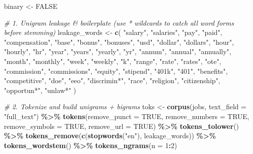\documentclass[
]{article}
\newenvironment{Shaded}{\begin{snugshade}}{\end{snugshade}}
\newcommand{\AttributeTok}[1]{\textcolor[rgb]{0.13,0.29,0.53}{#1}}
\newcommand{\CommentTok}[1]{\textcolor[rgb]{0.56,0.35,0.01}{\textit{#1}}}
\newcommand{\ConstantTok}[1]{\textcolor[rgb]{0.56,0.35,0.01}{#1}}
\newcommand{\DecValTok}[1]{\textcolor[rgb]{0.00,0.00,0.81}{#1}}
\newcommand{\FunctionTok}[1]{\textcolor[rgb]{0.13,0.29,0.53}{\textbf{#1}}}
\newcommand{\NormalTok}[1]{#1}
\newcommand{\OtherTok}[1]{\textcolor[rgb]{0.56,0.35,0.01}{#1}}
\newcommand{\SpecialCharTok}[1]{\textcolor[rgb]{0.81,0.36,0.00}{\textbf{#1}}}
\newcommand{\StringTok}[1]{\textcolor[rgb]{0.31,0.60,0.02}{#1}}
\begin{document}
\begin{Shaded}
\begin{Highlighting}[]
\NormalTok{binary }\OtherTok{\textless{}{-}} \ConstantTok{FALSE}

\CommentTok{\# 1. Unigram leakage \& boilerplate (use * wildcards to catch all word forms before stemming)}
\NormalTok{leakage\_words }\OtherTok{\textless{}{-}} \FunctionTok{c}\NormalTok{(}
  \StringTok{"salary"}\NormalTok{, }\StringTok{"salaries"}\NormalTok{, }\StringTok{"pay"}\NormalTok{, }\StringTok{"paid"}\NormalTok{, }\StringTok{"compensation"}\NormalTok{, }\StringTok{"base"}\NormalTok{, }\StringTok{"bonus"}\NormalTok{, }\StringTok{"bonuses"}\NormalTok{,}
  \StringTok{"usd"}\NormalTok{, }\StringTok{"dollar"}\NormalTok{, }\StringTok{"dollars"}\NormalTok{, }\StringTok{"hour"}\NormalTok{, }\StringTok{"hourly"}\NormalTok{, }\StringTok{"hr"}\NormalTok{, }\StringTok{"year"}\NormalTok{, }\StringTok{"years"}\NormalTok{, }\StringTok{"yearly"}\NormalTok{, }\StringTok{"yr"}\NormalTok{,}
  \StringTok{"annum"}\NormalTok{, }\StringTok{"annual"}\NormalTok{, }\StringTok{"annually"}\NormalTok{, }\StringTok{"month"}\NormalTok{, }\StringTok{"monthly"}\NormalTok{, }\StringTok{"week"}\NormalTok{, }\StringTok{"weekly"}\NormalTok{, }\StringTok{"k"}\NormalTok{,}
  \StringTok{"range"}\NormalTok{, }\StringTok{"rate"}\NormalTok{, }\StringTok{"rates"}\NormalTok{, }\StringTok{"ote"}\NormalTok{, }\StringTok{"commission"}\NormalTok{, }\StringTok{"commissions"}\NormalTok{, }\StringTok{"equity"}\NormalTok{,}
  \StringTok{"stipend"}\NormalTok{, }\StringTok{"401k"}\NormalTok{, }\StringTok{"401"}\NormalTok{, }\StringTok{"benefits"}\NormalTok{, }\StringTok{"competitive"}\NormalTok{, }\StringTok{"doe"}\NormalTok{,}
  \StringTok{"eeo"}\NormalTok{, }\StringTok{"discrimin*"}\NormalTok{, }\StringTok{"race"}\NormalTok{, }\StringTok{"religion"}\NormalTok{, }\StringTok{"citizenship"}\NormalTok{, }\StringTok{"opportun*"}\NormalTok{, }\StringTok{"unlaw*"}
\NormalTok{)}

\CommentTok{\# 2. Tokenize and build unigrams + bigrams}
\NormalTok{toks }\OtherTok{\textless{}{-}} \FunctionTok{corpus}\NormalTok{(jobs, }\AttributeTok{text\_field =} \StringTok{"full\_text"}\NormalTok{) }\SpecialCharTok{\%\textgreater{}\%}
  \FunctionTok{tokens}\NormalTok{(}\AttributeTok{remove\_punct =} \ConstantTok{TRUE}\NormalTok{, }\AttributeTok{remove\_numbers =} \ConstantTok{TRUE}\NormalTok{, }\AttributeTok{remove\_symbols =} \ConstantTok{TRUE}\NormalTok{, }\AttributeTok{remove\_url =} \ConstantTok{TRUE}\NormalTok{) }\SpecialCharTok{\%\textgreater{}\%}
  \FunctionTok{tokens\_tolower}\NormalTok{() }\SpecialCharTok{\%\textgreater{}\%}
  \FunctionTok{tokens\_remove}\NormalTok{(}\FunctionTok{c}\NormalTok{(}\FunctionTok{stopwords}\NormalTok{(}\StringTok{"en"}\NormalTok{), leakage\_words)) }\SpecialCharTok{\%\textgreater{}\%}
  \FunctionTok{tokens\_wordstem}\NormalTok{() }\SpecialCharTok{\%\textgreater{}\%}
  \FunctionTok{tokens\_ngrams}\NormalTok{(}\AttributeTok{n =} \DecValTok{1}\SpecialCharTok{:}\DecValTok{2}\NormalTok{)}


\end{Highlighting}
\end{Shaded}
\end{document}
